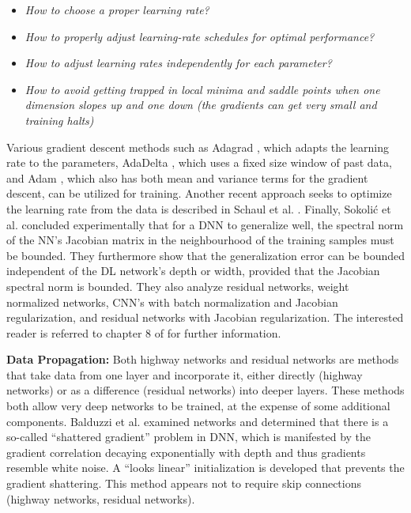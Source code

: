 \documentclass[12pt]{spieman}
\begin{document}
\begin{spacing}{1}
\begin{itemize}
    \setlength{\parskip}{0pt}
    \setlength{\itemsep}{0pt plus 1pt}
    \item \textit{How to choose a proper learning rate?}
    \item \textit{How to properly adjust learning-rate schedules for optimal performance? }
    \item \textit{How to adjust learning rates independently for each parameter?}
    \item \textit{How to avoid getting trapped in local minima and saddle points when one dimension slopes up and one down (the gradients can get very small and training halts)}
\end{itemize}

Various gradient descent methods such as Adagrad \cite{duchi2011adaptive} , which adapts the learning rate to the parameters, AdaDelta \cite{zeiler2012adadelta} , which uses a fixed size window of past data, and Adam \cite{kingma2014adam} , which also has both mean and variance terms for the gradient descent, can be utilized for training. Another recent approach seeks to optimize the learning rate from the data is described in Schaul et al. \cite{Schaul2013NoMore} . Finally, Sokoli\'{c} et al. \cite{sokolic2016robust} concluded experimentally that for a DNN to generalize well, the spectral norm of the NN's Jacobian matrix in the neighbourhood of the training samples must be bounded. They furthermore show that the generalization error can be bounded independent of the DL network's depth or width, provided that the Jacobian spectral norm is bounded. They also analyze residual networks, weight normalized networks, CNN's with batch normalization and Jacobian regularization, and residual networks with Jacobian regularization. The interested reader is referred to chapter 8 of \cite{goodfellow2016deep} for further information.

\textbf{Data Propagation:} Both highway networks \cite{srivastava2015highway} and residual networks \cite{he2015deep} are methods that take data from one layer and incorporate it, either directly (highway networks) or as a difference (residual networks) into deeper layers. These methods both allow very deep networks to be trained, at the expense of some additional components. Balduzzi et al. \cite{balduzzi2016neural} examined networks and determined that there is a so-called ``shattered gradient'' problem in DNN, which is manifested by the gradient correlation decaying exponentially with depth and thus gradients resemble white noise. A ``looks linear'' initialization is developed that prevents the gradient shattering. This method appears not to require skip connections (highway networks, residual networks).



\end{spacing}
\end{document}

